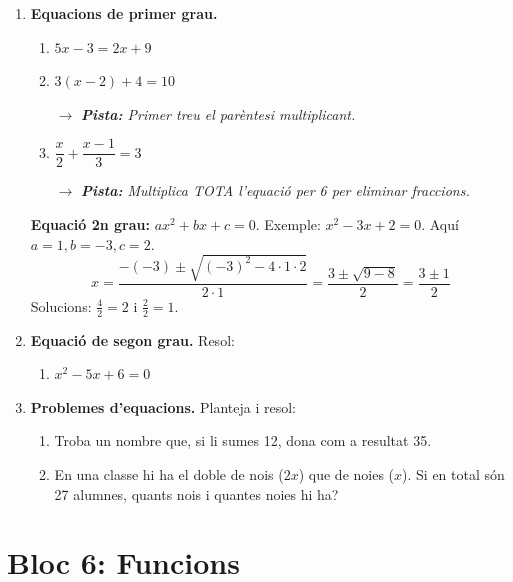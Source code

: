 \documentclass[12pt,a4paper]{article}
\newcommand{\pista}[1]{
    \par\vspace{2pt}
    {\small \color{blue!70!black} $\rightarrow$ \textit{\textbf{Pista:} #1}}
}
\begin{document}
\begin{enumerate}[resume]
    \item \textbf{Equacions de primer grau.} 
    \begin{enumerate}
        \item $5x - 3 = 2x + 9$ \vspace{1.5cm}
        \item $3(x - 2) + 4 = 10$ \pista{Primer treu el parèntesi multiplicant.} \vspace{1.5cm}
        \item $\dfrac{x}{2} + \dfrac{x-1}{3} = 3$ \pista{Multiplica TOTA l'equació per 6 per eliminar fraccions.} \vspace{2cm}
    \end{enumerate}
\newpage
\begin{exemple}
\textbf{Equació 2n grau:} $ax^2 + bx + c = 0$.
Exemple: $x^2 - 3x + 2 = 0$. Aquí $a=1, b=-3, c=2$.
$$ x = \frac{-(-3) \pm \sqrt{(-3)^2 - 4\cdot1\cdot2}}{2\cdot1} = \frac{3 \pm \sqrt{9 - 8}}{2} = \frac{3 \pm 1}{2} $$
Solucions: $\frac{4}{2}=2$ i $\frac{2}{2}=1$.
\end{exemple}

    \item \textbf{Equació de segon grau.} Resol:
    \begin{enumerate}
        \item $x^2 - 5x + 6 = 0$ \vspace{3cm}
    \end{enumerate}

    \item \textbf{Problemes d'equacions.} Planteja i resol:
    \begin{enumerate}
        \item Troba un nombre que, si li sumes 12, dona com a resultat 35. \vspace{2cm}
        \item En una classe hi ha el doble de nois ($2x$) que de noies ($x$). Si en total són 27 alumnes, quants nois i quantes noies hi ha? \vspace{3cm}
    \end{enumerate}
\end{enumerate}

\newpage

\section*{Bloc 6: Funcions}
\end{document}
